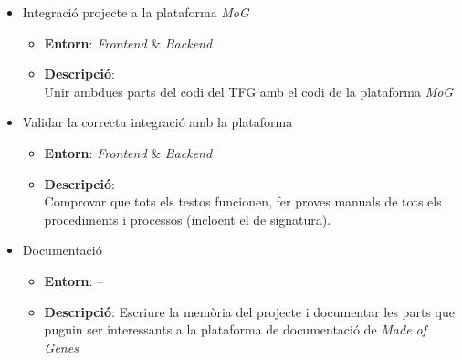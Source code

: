 \begin{itemize}
    \item Integració projecte a la plataforma \textit{MoG}
        \begin{itemize}
            \item \textbf{Entorn}: \textit{Frontend} \& \textit{Backend}
            \item \textbf{Descripció}: \\
            Unir ambdues parts del codi del TFG amb el codi de la plataforma \textit{MoG}
        \end{itemize}
    \item Validar la correcta integració amb la plataforma
        \begin{itemize}
            \item \textbf{Entorn}: \textit{Frontend} \& \textit{Backend}
            \item \textbf{Descripció}: \\
            Comprovar que tots els testos funcionen, fer proves manuals de tots els procediments i processos (incloent el de signatura).
        \end{itemize}
    \item Documentació
        \begin{itemize}
            \item \textbf{Entorn}: --
            \item \textbf{Descripció}: Escriure la memòria del projecte i documentar les parts que puguin ser interessants a la plataforma de documentació de \textit{Made of Genes}
        \end{itemize}
\end{itemize}


